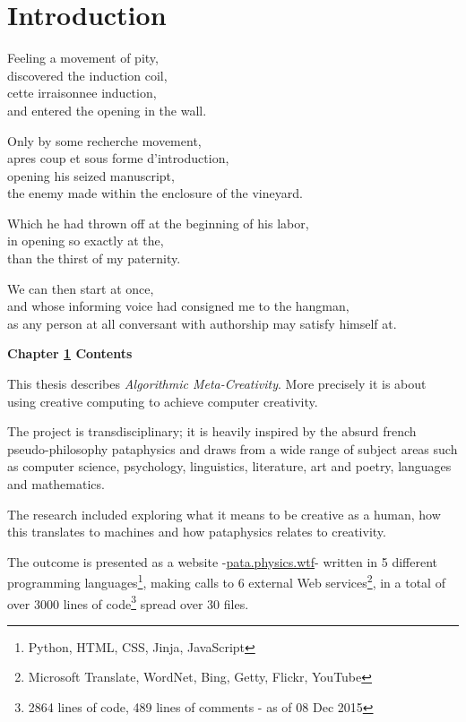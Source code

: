 
\chapter{Introduction}
\label{ch:introduction}

\startcontents[chapters]

\vfill

Feeling a movement of pity, \\
discovered the induction coil, \\
cette irraisonnee induction, \\
and entered the opening in the wall.

Only by some recherche movement, \\
apres coup et sous forme d'introduction, \\
opening his seized manuscript, \\
the enemy made within the enclosure of the vineyard.

Which he had thrown off at the beginning of his labor, \\
in opening so exactly at the, \\
than the thirst of my paternity.

We can then start at once, \\
and whose informing voice had consigned me to the hangman, \\
as any person at all conversant with authorship may satisfy himself at.

\newpage

{\huge \textbf{Chapter \ref{ch:introduction} Contents}}
\minicontents
\spirals

This thesis describes \textit{Algorithmic Meta-Creativity}. More precisely it is about using creative computing to achieve computer creativity.

The project is transdisciplinary; it is heavily inspired by the absurd french pseudo-philosophy pataphysics and draws from a wide range of subject areas such as computer science, psychology, linguistics, literature, art and poetry, languages and mathematics.

The research included exploring what it means to be creative as a human, how this translates to machines and how pataphysics relates to creativity.

The outcome is presented as a website -\url{pata.physics.wtf}- written in 5 different programming languages\footnote{Python, HTML, CSS, Jinja, JavaScript}, making calls to 6 external Web services\footnote{Microsoft Translate, WordNet, Bing, Getty, Flickr, YouTube}, in a total of over 3000 lines of code\footnote{2864 lines of code, 489 lines of comments - as of 08 Dec 2015} spread over 30 files.

